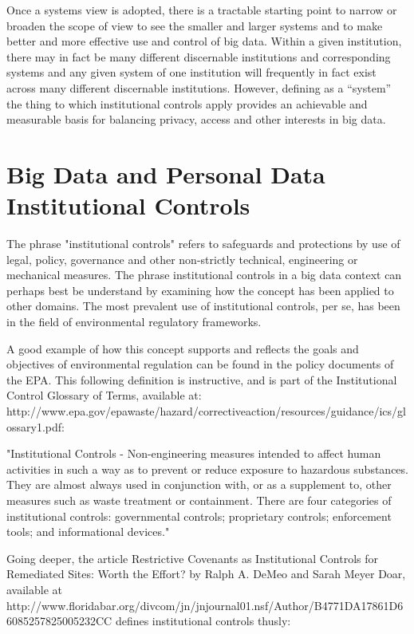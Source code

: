 Once a systems view is adopted, there is a tractable starting point to narrow or broaden the scope of view to see the smaller and larger systems and to make better and more effective use and control of big data.
Within a given institution, there may in fact be many different discernable institutions and corresponding systems and any given system of one institution will frequently in fact exist across many different discernable institutions. 
However, defining as a “system” the thing to which institutional controls apply provides an achievable and measurable basis for balancing privacy, access and other interests in big data.

\section{Big Data and Personal Data Institutional Controls}

The phrase "institutional controls" refers to safeguards and protections by use of legal, policy, governance and other non-strictly technical, engineering or mechanical measures.
The phrase institutional controls in a big data context can perhaps best be understand by examining how the concept has been applied to other domains.
The most prevalent use of institutional controls, per se, has been in the field of environmental regulatory frameworks.

A good example of how this concept supports and reflects the goals and objectives of environmental regulation can be found in the policy documents of the EPA.
This following definition is instructive, and is part of the Institutional Control Glossary of Terms, available at: http://www.epa.gov/epawaste/hazard/correctiveaction/resources/guidance/ics/glossary1.pdf:

"Institutional Controls - Non-engineering measures intended to affect human activities in such a way as to prevent or reduce exposure to hazardous substances. They are almost always used in conjunction with, or as a supplement to, other measures such as waste treatment or containment. There are four categories of institutional controls: governmental controls; proprietary controls; enforcement tools; and informational devices."

Going deeper, the article Restrictive Covenants as Institutional Controls for Remediated Sites: Worth the Effort? by Ralph A. DeMeo and Sarah Meyer Doar, available at http://www.floridabar.org/divcom/jn/jnjournal01.nsf/Author/B4771DA17861D66085257825005232CC defines institutional controls thusly:

